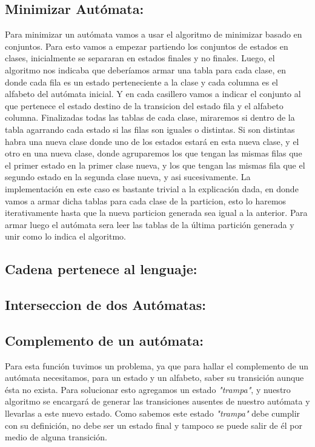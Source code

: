 \subsection{Minimizar Autómata:}
Para minimizar un autómata vamos a usar el algoritmo de minimizar basado en conjuntos. Para esto vamos a empezar partiendo los conjuntos de estados en clases, inicialmente se separaran en estados finales y no finales.\newline
Luego, el algoritmo nos indicaba que deberíamos armar una tabla para cada clase, en donde cada fila es un estado perteneciente a la clase y cada columna es el alfabeto del autómata inicial. Y en cada casillero vamos a indicar el conjunto al que pertenece el estado destino de la transicion del estado fila y el alfabeto columna.\newline
Finalizadas todas las tablas de cada clase, miraremos si dentro de la tabla agarrando cada estado si las filas son iguales o distintas. Si son distintas habra una nueva clase donde uno de los estados estará en esta nueva clase, y el otro en una nueva clase, donde agruparemos los que tengan las mismas filas que el primer estado en la primer clase nueva, y los que tengan las mismas fila que el segundo estado en la segunda clase nueva, y asi sucesivamente.\newline
La implementación en este caso es bastante trivial a la explicación dada, en donde vamos a armar dicha tablas para cada clase de la particion, esto lo haremos iterativamente hasta que la nueva particion generada sea igual a la anterior. Para armar luego el autómata sera leer las tablas de la última partición generada y unir como lo indica el algoritmo.

\subsection{Cadena pertenece al lenguaje:}

\subsection{Interseccion de dos Autómatas:}

\subsection{Complemento de un autómata:}
Para esta función tuvimos un problema, ya que para hallar el complemento de un autómata necesitamos, para un estado y un alfabeto, saber su transición aunque ésta no exista. Para solucionar esto agregamos un estado \textit{"trampa"}, y nuestro algoritmo se encargará de generar las transiciones ausentes de nuestro autómata y llevarlas a este nuevo estado. Como sabemos este estado \textit{"trampa"} debe cumplir con su definición, no debe ser un estado final y tampoco se puede salir de él por medio de alguna transición. 

